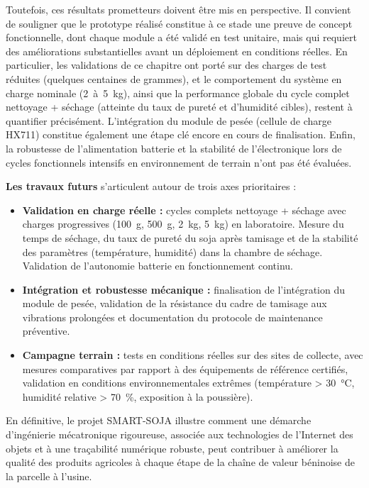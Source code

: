 \medskip

Toutefois, ces résultats prometteurs doivent être mis en perspective. Il convient de souligner que le prototype réalisé constitue à ce stade une preuve de concept fonctionnelle, dont chaque module a été validé en test unitaire, mais qui requiert des améliorations substantielles avant un déploiement en conditions réelles. En particulier, les validations de ce chapitre ont porté sur des charges de test réduites (quelques centaines de grammes), et le comportement du système en charge nominale (2~à~5~kg), ainsi que la performance globale du cycle complet nettoyage + séchage (atteinte du taux de pureté et d'humidité cibles), restent à quantifier précisément. L'intégration du module de pesée (cellule de charge HX711) constitue également une étape clé encore en cours de finalisation. Enfin, la robustesse de l'alimentation batterie et la stabilité de l'électronique lors de cycles fonctionnels intensifs en environnement de terrain n'ont pas été évaluées.

\medskip

\textbf{Les travaux futurs} s'articulent autour de trois axes prioritaires :
\begin{itemize}
    \item \textbf{Validation en charge réelle :} cycles complets nettoyage + séchage avec charges progressives (100~g, 500~g, 2~kg, 5~kg) en laboratoire. Mesure du temps de séchage, du taux de pureté du soja après tamisage et de la stabilité des paramètres (température, humidité) dans la chambre de séchage. Validation de l'autonomie batterie en fonctionnement continu.
    
    \item \textbf{Intégration et robustesse mécanique :} finalisation de l'intégration du module de pesée, validation de la résistance du cadre de tamisage aux vibrations prolongées et documentation du protocole de maintenance préventive.
    
    \item \textbf{Campagne terrain :} tests en conditions réelles sur des sites de collecte, avec mesures comparatives par rapport à des équipements de référence certifiés, validation en conditions environnementales extrêmes (température > 30~°C, humidité relative > 70~\%, exposition à la poussière).
\end{itemize}

\medskip

En définitive, le projet SMART-SOJA illustre comment une démarche d'ingénierie mécatronique rigoureuse, associée aux technologies de l'Internet des objets et à une traçabilité numérique robuste, peut contribuer à améliorer la qualité des produits agricoles à chaque étape de la chaîne de valeur béninoise de la parcelle à l'usine.

